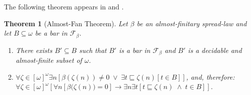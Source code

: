 \documentclass[a4paper]{amsart}
\theoremstyle{plain}
\newtheorem{theorem}{Theorem}
\begin{document}
The following theorem appears in \cite{veldman2001} and \cite[Section 7.2]{veldman2011c}.
\begin{theorem}[Almost-Fan Theorem]
\label{T:aft} Let $\beta$ be an almost-finitary spread-law and let $B\subseteq \omega$ be  a bar in $\mathcal{F}_\beta$. \begin{enumerate}[\upshape (i)] \item  There exists $B'\subseteq B$ such that $B'$ is a bar in $\mathcal{F}_\beta$ and $B'$ is a decidable and almost-finite subset of $\omega$. 
\item $\forall \zeta \in [\omega]^\omega\exists n[\beta(\zeta(n)) \neq 0 \;\vee \;\exists t\sqsubseteq \zeta(n)[t \in B]]$, and, therefore: \\$\forall \zeta \in [\omega]^\omega[\forall n[\beta\bigl(\zeta(n)\bigr)=0]\rightarrow \exists n \exists t[t\sqsubseteq \zeta(n)\;\wedge\; t \in B]]$.  \end{enumerate} \end{theorem}
\end{document}
